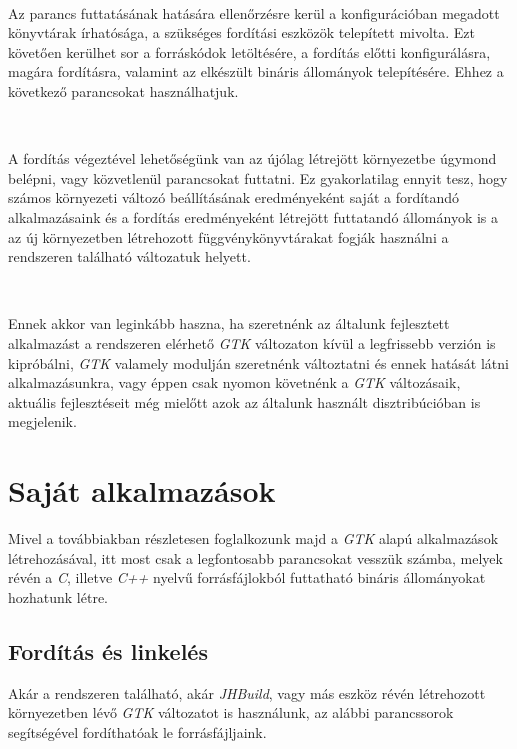 \\

Az parancs futtatásának hatására ellenőrzésre kerül a konfigurációban megadott könyvtárak írhatósága, a szükséges fordítási eszközök telepített mivolta. Ezt követően kerülhet sor a forráskódok letöltésére, a fordítás előtti konfigurálásra, magára  fordításra, valamint az elkészült bináris állományok telepítésére. Ehhez a következő parancsokat használhatjuk.

\\

A fordítás végeztével lehetőségünk van az újólag létrejött környezetbe úgymond belépni, vagy közvetlenül parancsokat futtatni. Ez gyakorlatilag ennyit tesz, hogy számos környezeti változó beállításának eredményeként saját a fordítandó alkalmazásaink és a fordítás eredményeként létrejött futtatandó állományok is a az új környezetben létrehozott függvénykönyvtárakat fogják használni a rendszeren található változatuk helyett.

\\

Ennek akkor van leginkább haszna, ha szeretnénk az általunk fejlesztett alkalmazást a rendszeren elérhető \textit{GTK} változaton kívül a legfrissebb verzión is kipróbálni, \textit{GTK} valamely modulján szeretnénk változtatni és ennek hatását látni alkalmazásunkra, vagy éppen csak nyomon követnénk a \textit{GTK} változásaik, aktuális fejlesztéseit még mielőtt azok az általunk használt disztribúcióban is megjelenik.

\section{Saját alkalmazások}

Mivel a továbbiakban részletesen foglalkozunk majd a \textit{GTK} alapú alkalmazások létrehozásával, itt most csak a legfontosabb parancsokat vesszük számba, melyek révén a \textit{C}, illetve \textit{C++} nyelvű forrásfájlokból futtatható bináris állományokat hozhatunk létre.

\subsection{Fordítás és linkelés}
\label{sec:compilingandlinking}

Akár a rendszeren található, akár \textit{JHBuild}, vagy más eszköz révén létrehozott környezetben lévő \textit{GTK} változatot is használunk, az alábbi parancssorok segítségével fordíthatóak le forrásfájljaink.

